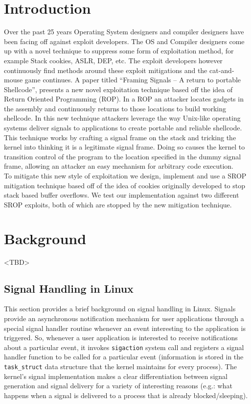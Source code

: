 \documentclass{sig-alternate-05-2015}
\begin{document}
\section{Introduction}
Over the past 25 years Operating System designers and compiler designers have been facing off against exploit developers. The OS and Compiler designers  come up with a novel technique to suppress some form of exploitation method, for example Stack cookies, ASLR, DEP, etc. The exploit developers however continuously find methods around these exploit mitigations and the cat-and-mouse game continues.  A paper titled “Framing Signals -- A return to portable Shellcode”,  presents a new novel exploitation technique based off the idea of Return Oriented Programming (ROP). In a ROP an attacker locates gadgets in the assembly and continuously returns to those locations to build working shellcode. In this new technique attackers leverage the way Unix-like operating systems deliver signals to applications to create portable and reliable shellcode. This technique works by crafting a signal frame on the stack and tricking the kernel into thinking it is a legitimate signal frame. Doing so causes the kernel to transition control of the program to the location specified in the dummy signal frame, allowing an attacker an easy mechanism for arbitrary code execution.\\
\indent
To mitigate this new style of exploitation we design, implement and use a SROP mitigation technique based off of the idea of cookies originally developed to stop stack based buffer overflows. We test our implementation against two different SROP exploits, both of which are stopped by the new mitigation technique.

\section {Background}
<TBD>
\subsection{Signal Handling in Linux}
This section provides a brief background on signal handling in Linux. Signals provide an asynchronous notification mechanism for user applications through a special signal handler routine whenever an event interesting to the application is triggered. So, whenever a user application is interested to receive notifications about a particular event, it invokes {\texttt{sigaction}} system call and registers a signal handler function to be called for a particular event (information is stored in the \texttt{task\_struct} data structure that the kernel maintains for every process). The kernel's signal implementation makes a clear differentiation between signal generation and signal delivery for a variety of interesting reasons (e.g.: what happens when a signal is delivered to a process that is already blocked/sleeping).
\end{document}
